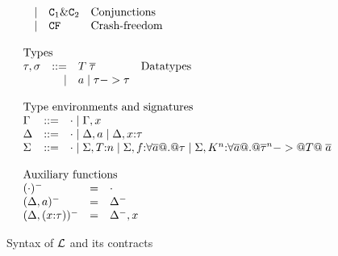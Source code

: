 \begin{figure}
\[\begin{array}{l}
\begin{array}{lrll}
     & \mid & \Ct_1 \& \Ct_2             & \text{Conjunctions}   \\
     & \mid & \CF                        & \text{Crash-freedom}   \\
\end{array}
\\ \\
\begin{array}{lrll}
\multicolumn{3}{l}{\text{Types}} \\
\tau,\sigma & ::=  & T\;\taus & \text{Datatypes} \\
            & \mid & a \mid \tau -> \tau
\end{array}
\\ \\
\begin{array}{lrll}
\multicolumn{3}{l}{\text{Type environments and signatures}} \\
\Gamma & ::=  & \cdot \mid \Gamma,x \\
\Delta & ::=  & \cdot \mid \Delta,a \mid \Delta,x{:}\tau \\
\Sigma & ::=  & \cdot \mid \Sigma,T{:}n \mid \Sigma,f{:}\forall\ol{a} @.@ \tau \mid \Sigma,K^{\ar}{:}\forall\ol{a} @.@ \oln{\tau}{\ar} -> @T@\;\as
\end{array}
\\ \\
\begin{array}{lrll}
\multicolumn{3}{l}{\text{Auxiliary functions}} \\
(\cdot)^{-}            & = & \cdot \\
(\Delta,a)^{-}         & = & \Delta^{-} \\
(\Delta,(x{:}\tau))^{-} & = & \Delta^{-},x
\end{array}
\end{array}\]
\caption{Syntax of $\cal L$ and its contracts}\label{fig:syntax}
\end{figure}

